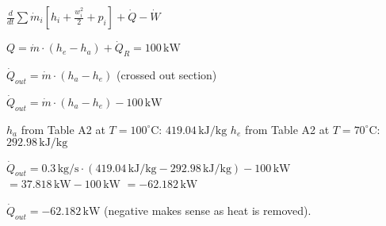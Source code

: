 \( \frac{d}{dt} \sum \dot{m}_i \left[ h_i + \frac{w_i^2}{2} + p_i \right] + \dot{Q} - \dot{W} \)  

\( Q = \dot{m} \cdot (h_e - h_a) + \dot{Q}_R = 100 \, \text{kW} \)  

\( \dot{Q}_{out} = \dot{m} \cdot (h_a - h_e) \) (crossed out section)  

\( \dot{Q}_{out} = \dot{m} \cdot (h_a - h_e) - 100 \, \text{kW} \)  

\( h_a \) from Table A2 at \( T = 100^\circ \text{C} \): \( 419.04 \, \text{kJ/kg} \)  
\( h_e \) from Table A2 at \( T = 70^\circ \text{C} \): \( 292.98 \, \text{kJ/kg} \)  

\( \dot{Q}_{out} = 0.3 \, \text{kg/s} \cdot (419.04 \, \text{kJ/kg} - 292.98 \, \text{kJ/kg}) - 100 \, \text{kW} \)  
\( = 37.818 \, \text{kW} - 100 \, \text{kW} \)  
\( = -62.182 \, \text{kW} \)  

\( \dot{Q}_{out} = -62.182 \, \text{kW} \) (negative makes sense as heat is removed).